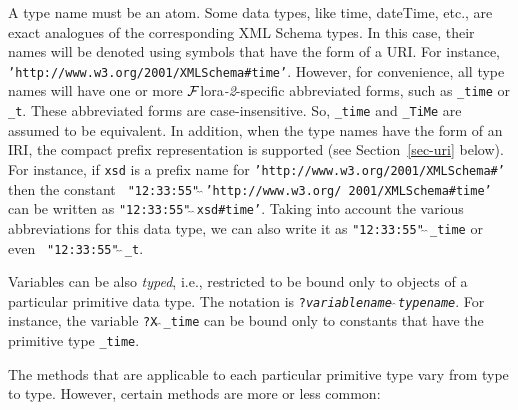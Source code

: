 \documentclass[11pt]{article}
\newcommand{\FLORA}{{\mbox{\sc ${\cal F}${lora}\rm\emph{-2}}}\xspace}
\begin{document}
A type name must be an atom.
Some data types, like time, dateTime, etc., are exact analogues of the
corresponding XML Schema types. In this case, their names will be denoted
using symbols that have the form of a URI. For instance,
{\tt 'http://www.w3.org/2001/XMLSchema\#time'}.  However, for convenience,
all type names will have one or more \FLORA-specific abbreviated forms, such as
{\tt \_time} or {\tt \_t}. These abbreviated forms are
case-insensitive. So, {\tt \_time} and
{\tt \_TiMe} are assumed to be equivalent. In addition, when the type names have
the form of an IRI, the compact prefix representation is supported (see
Section~\ref{sec-uri} below). For
instance, if {\tt xsd}  is a prefix name for
{\tt 'http://www.w3.org/2001/XMLSchema\#'} 
then the constant {\tt
  "12:33:55"$\hat{~}\hat{~}$'http://www.w3.org/ 2001/XMLSchema\#time'}  can be written as
{\tt "12:33:55"$\hat{~}\hat{~}$xsd\#time'}. Taking into account the
various abbreviations for this data type, we can also write it as
{\tt "12:33:55"$\hat{~}\hat{~}$\_time} or even {\tt
  "12:33:55"$\hat{~}\hat{~}$\_t}.

Variables can be also \emph{typed}, i.e., restricted to be bound only to 
objects of a particular primitive data type. The notation is
{\tt ?\emph{variablename}$\hat{~}\hat{~}$\emph{typename}}. 
For instance, the variable {\tt ?X$\hat{~}\hat{~}$\_time}  
can be bound only to constants that have the primitive type {\tt \_time}. 

The methods that are applicable to each particular primitive type vary from
type to type. However, certain methods are more or less common:
\end{document}
